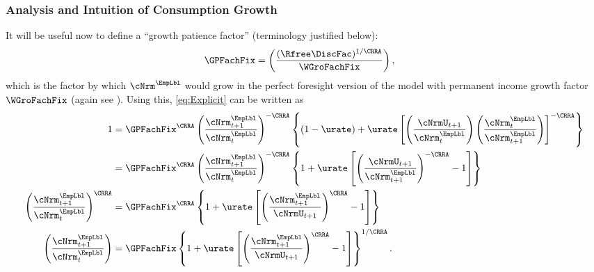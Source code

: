 \documentclass{econark}
\begin{document}
\subsubsection{Analysis and Intuition of Consumption Growth}
It will be useful now to define a ``growth patience factor'' (terminology justified below):
\begin{equation}\begin{gathered}\begin{aligned}
  \GPFachFix & =  \left(\frac{(\Rfree\DiscFac)^{1/\CRRA}}{\WGroFachFix}\right), \label{eq:GPFacRaw}
\end{aligned}\end{gathered}\end{equation}
which is the factor by which ${\cNrm}^{\EmpLbl}$ would grow in the perfect foresight version of the model with permanent income growth factor $\WGroFachFix$ (again see ).  Using this, \eqref{eq:Explicit} can be written as
\begin{equation}\begin{gathered}\begin{aligned}
        1  & = \GPFachFix^{\CRRA} \left(\frac{{\cNrm}^{\EmpLbl}_{t+1}}{{\cNrm}^{\EmpLbl}_{t}}\right)^{-\CRRA} \left\{(1-\urate)+\urate\left[\left(\frac{\cNrmU_{t+1}}{{\cNrm}^{\EmpLbl}_{t}}\right)\left(\frac{{\cNrm}^{\EmpLbl}_{t}}{{\cNrm}^{\EmpLbl}_{t+1}}\right)\right]^{-\CRRA}\right\} 
\\       & = \GPFachFix^{\CRRA} \left(\frac{{\cNrm}^{\EmpLbl}_{t+1}}{{\cNrm}^{\EmpLbl}_{t}}\right)^{-\CRRA} \left\{1+\urate\left[\left(\frac{\cNrmU_{t+1}}{{\cNrm}^{\EmpLbl}_{t+1}}\right)^{-\CRRA}-1\right]\right\}  \label{eq:BeforePFStep}
\\       \left(\frac{{\cNrm}^{\EmpLbl}_{t+1}}{{\cNrm}^{\EmpLbl}_{t}}\right)^{\CRRA} & = \GPFachFix^{\CRRA} \left\{1+\urate\left[\left(\frac{{\cNrm}^{\EmpLbl}_{t+1}}{\cNrmU_{t+1}}\right)^{\CRRA}-1\right]\right\} 
\\       \left(\frac{{\cNrm}^{\EmpLbl}_{t+1}}{{\cNrm}^{\EmpLbl}_{t}}\right) & = {\GPFachFix} \left\{1+\urate\left[\left(\frac{{\cNrm}^{\EmpLbl}_{t+1}}{\cNrmU_{t+1}}\right)^{\CRRA}-1\right]\right\}^{1/\CRRA}.  
\end{aligned}\end{gathered}\end{equation}


\end{document}
